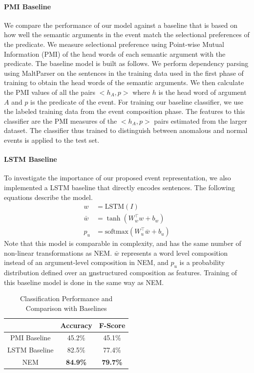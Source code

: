 \paragraph{PMI Baseline} We compare the performance of our model against a baseline that is based
on how well the semantic arguments in the event match the selectional preferences 
of the predicate.  We measure selectional preference using Point-wise Mutual Information
(PMI) \cite{church1990word} of the head words of each semantic argument with the predicate.  
The baseline model is built as follows.  We perform dependency parsing using MaltParser
\cite{nivre2007maltparser} on the sentences in the training data used in the first phase of training to
obtain the head words of the semantic arguments.  We then calculate the PMI values of all the pairs
$<h_A, p>$ where $h$ is the head word of argument $A$ and $p$ is the predicate of the event.  
For training our baseline classifier, we use the labeled training data from the event composition phase.
The features to this classifier are the PMI measures of the $<h_A, p>$ pairs estimated from the larger
dataset.  The classifier thus trained to distinguish between anomalous and normal events is applied to the test set.

\paragraph{LSTM Baseline} To investigate the importance of our proposed event representation, we also implemented a LSTM baseline that
directly encodes sentences. The following equations describe the model.
\begin{align}
 w &= \text{LSTM}(I) \\
 \bar{w} &= \tanh(W_w^\intercal w + b_w) \\
 p_u &= \text{softmax}(W_u^\intercal \bar{w} + b_u)
\end{align}
Note that this model is comparable in complexity, and has the same number of non-linear transformations as NEM. $\bar{w}$ represents a
word level composition instead of an argument-level composition in NEM, and $p_u$ is a probability distribution defined over an
\underline{u}nstructured composition as features. Training of this baseline model is done in the same way as NEM.

\begin{table}
\begin{center}
  \begin{tabular}[c]{|c|c|c|}
 \cline{2-3}
 \multicolumn{1}{c|}{}& \textbf{Accuracy} & \textbf{F-Score} \\
 \hline
 PMI Baseline& 45.2\% & 45.1\%\\
 LSTM Baseline & 82.5\% & 77.4\%\\
 \hline
 NEM & \textbf{84.9\%}& \textbf{79.7\%}\\
 \hline
  \end{tabular}
\end{center}
 \caption{Classification Performance and Comparison with Baselines}
 \label{table:nem_anomaly_results}
\end{table}


